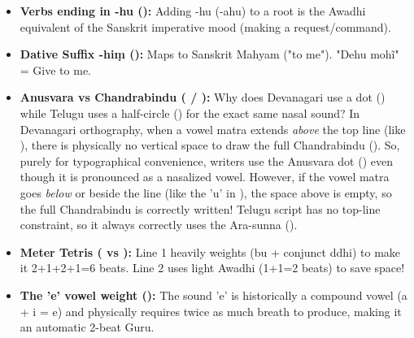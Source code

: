 \begin{tcolorbox}[gotchabox]
\begin{itemize}
    \item \textbf{Verbs ending in -hu ():} Adding -hu (-ahu) to a root is the Awadhi equivalent of the Sanskrit imperative mood (making a request/command).
    \item \textbf{Dative Suffix -hiṃ ():} Maps to Sanskrit Mahyam ("to me"). "Dehu mohĩ" = Give to me.
    \item \textbf{Anusvara vs Chandrabindu ( / ):} Why does Devanagari use a dot () while Telugu uses a half-circle () for the exact same nasal sound? In Devanagari orthography, when a vowel matra extends \textit{above} the top line (like ), there is physically no vertical space to draw the full Chandrabindu (). So, purely for typographical convenience, writers use the Anusvara dot () even though it is pronounced as a nasalized vowel. However, if the vowel matra goes \textit{below} or beside the line (like the 'u' in ), the space above is empty, so the full Chandrabindu  is correctly written! Telugu script has no top-line constraint, so it always correctly uses the Ara-sunna ().
    \item \textbf{Meter Tetris ( vs ):} Line 1 heavily weights  (bu + conjunct ddhi) to make it 2+1+2+1=6 beats. Line 2 uses light Awadhi  (1+1=2 beats) to save space!
    \item \textbf{The 'e' vowel weight ():} The sound 'e' is historically a compound vowel (a + i = e) and physically requires twice as much breath to produce, making it an automatic 2-beat Guru.
\end{itemize}
\end{tcolorbox}

\newpage
